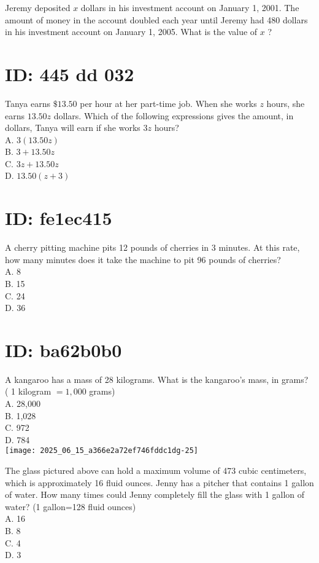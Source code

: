 









Jeremy deposited $x$ dollars in his investment account on January 1, 2001. The amount of money in the account doubled each year until Jeremy had 480 dollars in his investment account on January 1, 2005. What is the value of $x$ ?

\section*{ID: 445 dd 032}
Tanya earns $\$ 13.50$ per hour at her part-time job. When she works $z$ hours, she earns $13.50 z$ dollars. Which of the following expressions gives the amount, in dollars, Tanya will earn if she works $3 z$ hours?\\
A. $3(13.50 z)$\\
B. $3+13.50 z$\\
C. $3 z+13.50 z$\\
D. $13.50(z+3)$

\section*{ID: fe1ec415}
A cherry pitting machine pits 12 pounds of cherries in 3 minutes. At this rate, how many minutes does it take the machine to pit 96 pounds of cherries?\\
A. 8\\
B. 15\\
C. 24\\
D. 36

\section*{ID: ba62b0b0}
A kangaroo has a mass of 28 kilograms. What is the kangaroo's mass, in grams? ( 1 kilogram $=1,000$ grams)\\
A. 28,000\\
B. 1,028\\
C. 972\\
D. 784\\
\texttt{[image: 2025\_06\_15\_a366e2a72ef746fddc1dg-25]}

The glass pictured above can hold a maximum volume of 473 cubic centimeters, which is approximately 16 fluid ounces. Jenny has a pitcher that contains 1 gallon of water. How many times could Jenny completely fill the glass with 1 gallon of water? (1 gallon=128 fluid ounces)\\
A. 16\\
B. 8\\
C. 4\\
D. 3

